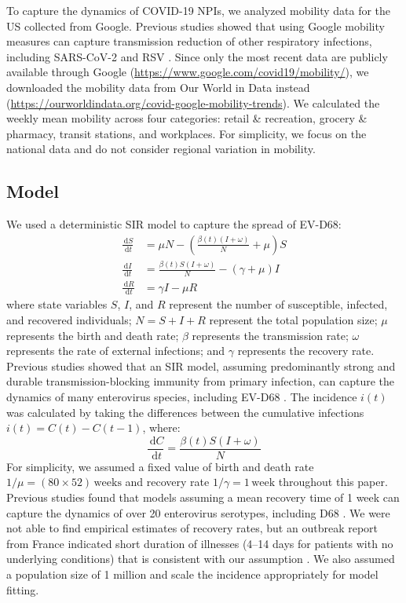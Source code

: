 \documentclass[12pt]{article}
\newcommand{\dd}[1]{\ensuremath{\, \mathrm{d}#1}}
\begin{document}
To capture the dynamics of COVID-19 NPIs, we analyzed mobility data for the US collected from Google.
Previous studies showed that using Google mobility measures can capture transmission reduction of other respiratory infections, including SARS-CoV-2 \citep{nouvellet2021reduction} and RSV \citep{krauer2022estimating}.
Since only the most recent data are publicly available through Google (\url{https://www.google.com/covid19/mobility/}), we downloaded the mobility data from Our World in Data instead (\url{https://ourworldindata.org/covid-google-mobility-trends}).
We calculated the weekly mean mobility across four categories: retail \& recreation, grocery \& pharmacy, transit stations, and workplaces.
For simplicity, we focus on the national data and do not consider regional variation in mobility.

\subsection{Model}

We used a deterministic SIR model to capture the spread of EV-D68:
\begin{align}
\frac{\dd{S}}{\dd{t}} &= \mu N - \left(\frac{\beta(t) (I + \omega)}{N} + \mu\right) S\\
\frac{\dd{I}}{\dd{t}} &= \frac{\beta(t) S (I + \omega)}{N} - (\gamma + \mu) I\\
\frac{\dd{R}}{\dd{t}} &= \gamma I - \mu R
\end{align}
where state variables
$S$, $I$, and $R$ represent the number of susceptible, infected, and recovered individuals;
$N = S + I + R$ represent the total population size;
$\mu$ represents the birth and death rate;
$\beta$ represents the transmission rate;
$\omega$ represents the rate of external infections;
and $\gamma$ represents the recovery rate.
Previous studies showed that an SIR model, assuming predominantly strong and durable
transmission-blocking immunity from primary infection, can capture the dynamics of many enterovirus species, including EV-D68 \citep{pons2018serotype,park2021epidemiological}.
The incidence $i(t)$ was calculated by taking the differences between the cumulative infections $i(t) = C(t) - C(t-1)$, where:
\begin{equation}
\frac{\dd{C}}{\dd{t}} = \frac{\beta(t) S (I + \omega)}{N}
\end{equation}
For simplicity, we assumed a fixed value of birth and death rate $1/\mu = (80\times 52)\,\textrm{weeks}$ and recovery rate $1/\gamma=1\,\textrm{week}$ throughout this paper.
Previous studies found that models assuming a mean recovery time of 1 week can capture the dynamics of over 20 enterovirus serotypes, including D68 \citep{pons2018serotype,park2021epidemiological}.
We were not able to find empirical estimates of recovery rates, but an outbreak report from France indicated short duration of illnesses (4--14 days for patients with no underlying conditions) that is consistent with our assumption \citep{midgley2015emergence}.
We also assumed a population size of 1 million and scale the incidence appropriately for model fitting.
\end{document}
